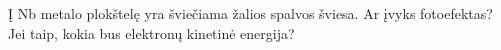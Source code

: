 \question Į Nb metalo plokštelę yra šviečiama žalios spalvos šviesa. Ar įvyks fotoefektas? Jei taip, kokia bus elektronų kinetinė energija?